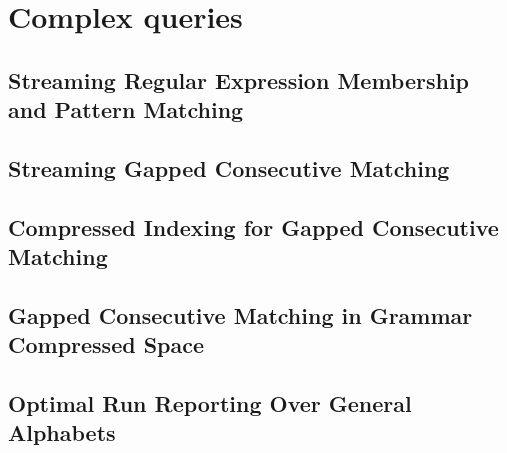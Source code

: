 \part{Complex queries}\label{part:complex_queries}

\mainmatter
\chapter{Streaming Regular Expression Membership and Pattern Matching}\label{chap:regexp}


\mainmatter
\chapter{Streaming Gapped Consecutive Matching}\label{chap:gapped_stream}

\mainmatter
\chapter{Compressed Indexing for Gapped Consecutive Matching}\label{chap:gapped_index}


\mainmatter
\chapter{Gapped Consecutive Matching in Grammar Compressed Space}\label{chap:gapped_pm}

\mainmatter
\chapter{Optimal Run Reporting Over General Alphabets}\label{chap:squares}
